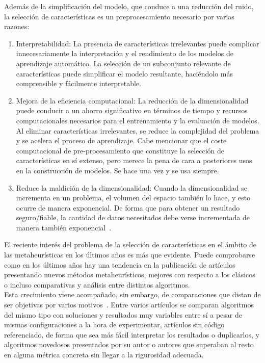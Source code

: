 Además de la simplificación del modelo, que conduce a una reducción del ruido, la
selección de características es un preprocesamiento necesario por varias razones:
\begin{enumerate}
      \item Interpretabilidad: La presencia de características
            irrelevantes puede complicar innecesariamente la interpretación y el
            rendimiento de los modelos de aprendizaje automático. La selección de un
            subconjunto relevante de características puede simplificar el modelo
            resultante, haciéndolo más comprensible y fácilmente interpretable.

      \item Mejora de la eficiencia computacional: La reducción de la
            dimensionalidad puede conducir a un ahorro significativo en términos de
            tiempo y recursos computacionales necesarios para el entrenamiento y la
            evaluación de modelos. Al eliminar características irrelevantes, se reduce
            la complejidad del problema y se acelera el proceso de aprendizaje. Cabe mencionar que el coste computacional de pre-procesamiento que constituye la selección de características en sí extenso, pero merece la pena de cara a posteriores usos en la construcción de modelos. Se hace una vez y se usa siempre.

      \item Reduce la maldición de la dimensionalidad: Cuando la dimensionalidad
            se incrementa en un problema, el volumen del espacio también lo hace, y esto ocurre de manera exponencial. De forma que para
            obtener un resultado seguro/fiable, la cantidad de datos necesitados debe verse incrementada de manera también exponencial~\cite{udacity2015curse}.
\end{enumerate}

El reciente interés del problema de la selección de características en el ámbito de las
metaheurísticas en los últimos años es más que evidente. Puede comprobarse como en los
últimos años hay una tendencia en la publicación de artículos presentando nuevos métodos
metaheurísticos, mejores con respecto a los clásicos o incluso comparativas y análisis entre
distintos algoritmos.\\[6pt]

Esta crecimiento viene acompañado, sin embargo, de comparaciones que distan de ser objetivas
por varios motivos~\cite{molina_comprehensive_2020}. Entre varios artículos se comparan algoritmos del mismo tipo con
soluciones y resultados muy variables entre sí a pesar de mismas configuraciones a la hora
de experimentar, artículos sin código referenciado, de forma que sea más fácil interpretar
los resultados o duplicarlos, y algoritmos novedosos presentados por su autor o autores que
superaban al resto en alguna métrica concreta sin llegar a la rigurosidad adecuada.\\[6pt]

